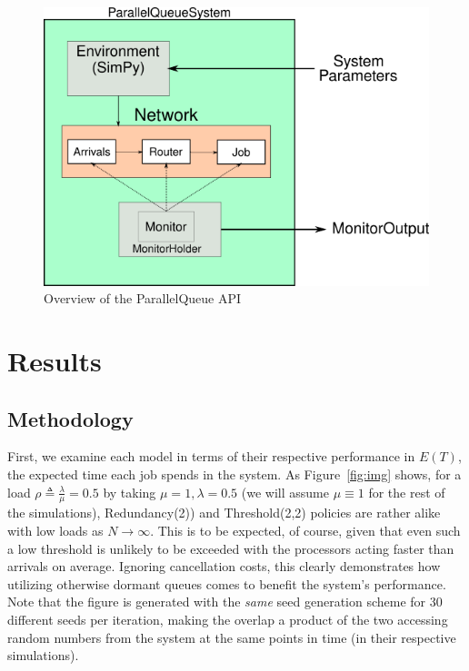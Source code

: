 \begin{figure}
    \centering
    \includegraphics[scale=0.7]{pq}
    \caption{Overview of the ParallelQueue API}
    \label{fig:API}
\end{figure}


\section{Results}\label{sec:results}

\subsection{Methodology}\label{subsec:methodology}
First, we examine each model in terms of their respective performance in $E(T)$, the expected time each job spends in the system.
As Figure~\ref{fig:img} shows, for a load $\rho \triangleq \frac{\lambda}{\mu} = 0.5$ by taking $\mu=1, \lambda = 0.5$ (we will assume $\mu \equiv 1$ for the
rest of the simulations), Redundancy(2)) and Threshold(2,2) policies are rather alike with low loads as $N \rightarrow \infty$. This is to be expected, of course, given that even such a low threshold is unlikely to be exceeded with the processors acting faster than arrivals on average. Ignoring cancellation costs, this clearly demonstrates how utilizing otherwise dormant queues comes to benefit the system's performance. Note that the figure is generated with the \textit{same} seed generation scheme for 30 different seeds per iteration, making the overlap a product of the two accessing random numbers from the system at the same points in time (in their respective simulations).

